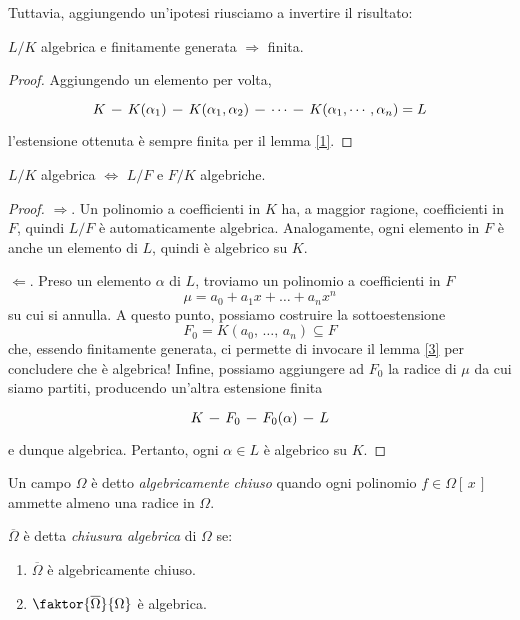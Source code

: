 \begin{multicols}{2}
Tuttavia, aggiungendo un'ipotesi riusciamo a invertire il risultato:

\begin{prop}\label{3}
	$ L/K $ algebrica e finitamente generata $ \Rightarrow $ finita.
\end{prop}
\begin{proof}
	Aggiungendo un elemento per volta,
	\[\begin{tikzcd}[column sep=0.25cm]
	K \arrow [r,-] &
	K(\alpha_1) \arrow[r,-] &
	K(\alpha_1, \alpha_2) \arrow[r,-] &
	\cdots \arrow[r,-] &
	K(\alpha_1, \cdots, \alpha_n) = L
	\end{tikzcd} \]
	 l'estensione ottenuta è sempre finita per il lemma \ref{1}.
\end{proof}

\begin{prop}\label{4}
	$ L/K $ algebrica $ \Leftrightarrow $ $ L/F $ e $ F/K $ algebriche.
\end{prop}
\begin{proof}
	$ \Rightarrow $. Un polinomio a coefficienti in $ K $ ha, a maggior ragione, coefficienti in $ F $, quindi $ L/F $ è automaticamente algebrica. Analogamente, ogni elemento in $ F $ è anche un elemento di $ L $, quindi è algebrico su $ K $.
	
	$ \Leftarrow $. Preso un elemento $ \alpha $ di $ L $, troviamo un polinomio a coefficienti in $ F $
	\[ \mu = a_0 + a_1 x + \dots + a_n x^n \]
	su cui si annulla. A questo punto, possiamo costruire la sottoestensione
	\[ F_0 = K(a_0,\, \dots,\, a_n) \subseteq F \]
	che, essendo finitamente generata, ci permette di invocare il lemma \ref{3} per concludere che è algebrica! Infine, possiamo aggiungere ad $ F_0 $ la radice di $ \mu $ da cui siamo partiti, producendo un'altra estensione finita
	\[\begin{tikzcd}[column sep=0.25cm]
	K \arrow [r,-] &
	F_0 \arrow[r,-] &
	F_0(\alpha) \arrow[r,-] &
	L
	\end{tikzcd} \]
	e dunque algebrica. Pertanto, ogni $ \alpha \in L $ è algebrico su $ K $.
\end{proof}

\begin{definition}
	Un campo $ \Omega $ è detto \emph{algebricamente chiuso} quando ogni polinomio $ f \in \Omega[\, x\,] $ ammette almeno una radice in $ \Omega $.
\end{definition}

\begin{definition}
	$ \overline{\Omega} $ è detta \emph{chiusura algebrica} di $ \Omega $ se:
	\begin{enumerate}
		\item $ \overline{\Omega} $ è algebricamente chiuso.
		\item $ \faktor{\overline{\Omega}}{\Omega} $ è algebrica.
	\end{enumerate}
\end{definition}


\end{multicols}
